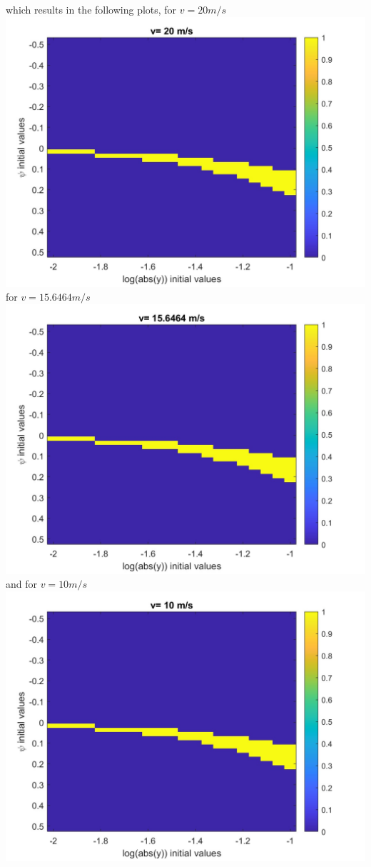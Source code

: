 \documentclass[12pt]{article}
\begin{document}
which results in the following plots, for $v=20m/s$\\
\includegraphics[scale=0.4]{Problem5v20.jpg}\\
for $v=15.6464m/s$\\
\includegraphics[scale=0.4]{Problem5v15.jpg}\\
and for $v=10m/s$\\
\includegraphics[scale=0.4]{Problem5v0.jpg}\\
\end{document}
